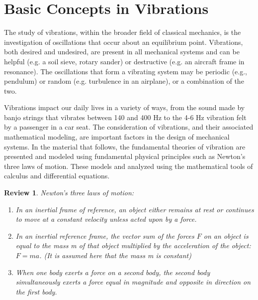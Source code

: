 \documentclass[12pt,letter]{article}
\numberwithin{ex}{section} %
\newtheorem{re}{Review}
\numberwithin{re}{section} %
\newenvironment{review}{\begin{mdframed}[middlelinewidth=2mm,roundcorner=20pt]\begin{re}\normalfont}{\end{re}\end{mdframed}}
\numberwithin{vcs}{section} %
\begin{document}
	
	\setcounter{section}{0}	
	\setcounter{figure}{0}   
	\renewcommand\thefigure{\thesection.\arabic{figure}}
	\setcounter{equation}{0}   
	\renewcommand\theequation{\thesection.\arabic{equation}}

	\section{Basic Concepts in Vibrations}

    The study of vibrations, within the broader field of classical mechanics, is the investigation of oscillations that occur about an equilibrium point. Vibrations, both desired and undesired, are present in all mechanical systems and can be helpful (e.g. a soil sieve, rotary sander) or destructive (e.g. an aircraft frame in resonance). The oscillations that form a vibrating system may be periodic (e.g., pendulum) or random (e.g. turbulence in an airplane), or a combination of the two. 

    Vibrations impact our daily lives in a variety of ways, from the sound made by banjo strings that vibrates between 140 and 400 Hz to the 4-6 Hz vibration felt by a passenger in a car seat. The consideration of vibrations, and their associated mathematical modeling, are important factors in the design of mechanical systems. In the material that follows, the fundamental theories of vibration are presented and modeled using fundamental physical principles such as Newton's three laws of motion. These models and analyzed using the mathematical tools of calculus and differential equations. 

	\begin{review}
		Newton's three laws of motion:
		\begin{enumerate}
			\item In an inertial frame of reference, an object either remains at rest or continues to move at a constant velocity unless acted upon by a force.
			\item In an inertial reference frame, the vector sum of the forces $F$ on an object is equal to the mass m of that object multiplied by the acceleration of the object: $F = ma$. (It is assumed here that the mass m is constant)
			\item When one body exerts a force on a second body, the second body simultaneously exerts a force equal in magnitude and opposite in direction on the first body.
		\end{enumerate}
	\end{review}
\end{document}
